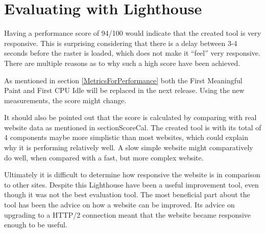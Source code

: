 \section{Evaluating with Lighthouse}

Having a performance score of 94/100 would indicate that the created tool is very responsive. This is surprising considering that there is a delay between 3-4 seconds before the raster is loaded, which does not make it “feel” very responsive. There are multiple reasons as to why such a high score have been achieved.

As mentioned in section \ref{MetricsForPerformance} both the First Meaningful Paint and First CPU Idle will be replaced in the next release. Using the new measurements, the score might change.

It should also be pointed out that the score is calculated by comparing with real website data as mentioned in section{ScoreCal}. The created tool is with its total of 4 components maybe more simplistic than most websites, which could explain why it is performing relatively well. A slow simple website might comparatively do well, when compared with a fast, but more complex website.

Ultimately it is difficult to determine how responsive the website is in comparison to other sites. Despite this Lighthouse have been a useful improvement tool, even though it was not the best evaluation tool. The most beneficial part about the tool has been the advice on how a website can be improved. Its advice on upgrading to a HTTP/2 connection meant that the website became responsive enough to be useful. 

%

